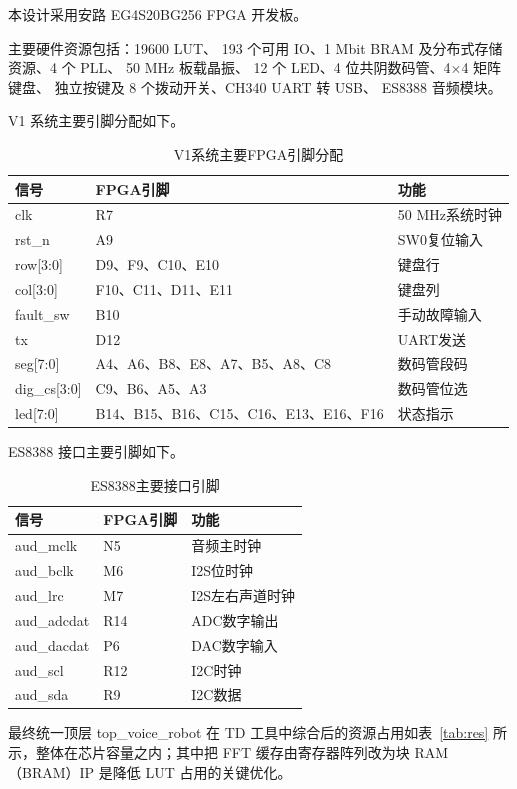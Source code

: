 \documentclass[UTF8,zihao=-4,fontset=windows]{ctexart}
\newcommand{\code}[1]{{\ttfamily #1}}
\begin{document}
本设计采用安路 EG4S20BG256 FPGA 开发板。

主要硬件资源包括：19600 LUT、 193 个可用 IO、1 Mbit BRAM 及分布式存储资源、4 个 PLL、 50 MHz 板载晶振、 12 个 LED、4 位共阴数码管、4$\times$4 矩阵键盘、 独立按键及 8 个拨动开关、CH340 UART 转 USB、 ES8388 音频模块。

V1 系统主要引脚分配如下。

\begin{table}[H]
\centering
\caption{V1系统主要FPGA引脚分配}
\begin{tabular}{p{4cm}p{4.5cm}p{5cm}}
\toprule
信号 & FPGA引脚 & 功能 \\
\midrule
clk & R7 & 50 MHz系统时钟 \\
rst\_n & A9 & SW0复位输入 \\
row[3:0] & D9、F9、C10、E10 & 键盘行 \\
col[3:0] & F10、C11、D11、E11 & 键盘列 \\
fault\_sw & B10 & 手动故障输入 \\
tx & D12 & UART发送 \\
seg[7:0] & A4、A6、B8、E8、A7、B5、A8、C8 & 数码管段码 \\
dig\_cs[3:0] & C9、B6、A5、A3 & 数码管位选 \\
led[7:0] & B14、B15、B16、C15、C16、E13、E16、F16 & 状态指示 \\
\bottomrule
\end{tabular}
\end{table}

ES8388 接口主要引脚如下。

\begin{table}[H]
\centering
\caption{ES8388主要接口引脚}
\begin{tabular}{p{5cm}p{4cm}p{5cm}}
\toprule
信号 & FPGA引脚 & 功能 \\
\midrule
aud\_mclk & N5 & 音频主时钟 \\
aud\_bclk & M6 & I2S位时钟 \\
aud\_lrc & M7 & I2S左右声道时钟 \\
aud\_adcdat & R14 & ADC数字输出 \\
aud\_dacdat & P6 & DAC数字输入 \\
aud\_scl & R12 & I2C时钟 \\
aud\_sda & R9 & I2C数据 \\
\bottomrule
\end{tabular}
\end{table}

最终统一顶层 \code{top\_voice\_robot} 在 TD 工具中综合后的资源占用如表~\ref{tab:res} 所示，整体在芯片容量之内；其中把 FFT 缓存由寄存器阵列改为块 RAM（BRAM）IP 是降低 LUT 占用的关键优化。
\end{document}
